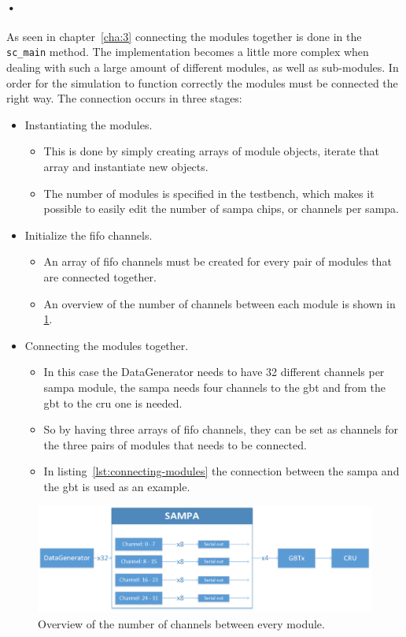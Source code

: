 \documentclass[a4paper, 12pt]{report}\dfrac{\right }{•}
\newcommand{\codeword}[1]{\texttt{#1}}
\begin{document}
\paragraph{•}
As seen in chapter~\ref{cha:3} connecting the modules together is done in the \codeword{sc\_main} method.
The implementation becomes a little more complex when dealing with such a large amount of different modules, as well as sub-modules.
In order for the simulation to function correctly the modules must be connected the right way.
The connection occurs in three stages:
\begin{itemize}
	\item Instantiating the modules.
		\begin{itemize}
			\item This is done by simply creating arrays of module objects, iterate that array and instantiate new objects.
			\item The number of modules is specified in the testbench, which makes it possible to easily edit the number of \gls{sampa} chips, or channels per \gls{sampa}.
		\end{itemize}
	\item Initialize the \gls{fifo} channels.
		\begin{itemize}
			\item An array of \gls{fifo} channels must be created for every pair of modules that are connected together.
			\item An overview of the number of channels between each module is shown in \ref{fig:sampa-overview}.
		\end{itemize}
	\item Connecting the modules together.
		\begin{itemize}
			\item In this case the DataGenerator needs to have 32 different channels per \gls{sampa} module, the \gls{sampa} needs four channels to the \gls{gbt} and from the \gls{gbt} to the \gls{cru} one is needed.
			\item So by having three arrays of \gls{fifo} channels, they can be set as channels for the three pairs of modules that needs to be connected.
			\item In listing~\ref{lst:connecting-modules} the connection between the \gls{sampa} and the \gls{gbt} is used as an example.
		\end{itemize}
\end{itemize}

\begin{figure}[h!]
	\centering
		\includegraphics[width=1.0\textwidth]{images/sampa-overview.png}
		\caption{Overview of the number of channels between every module.}
		\label{fig:sampa-overview}
\end{figure}
\end{document}
